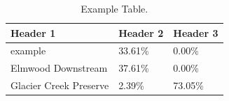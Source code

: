 \begin{table}[htbp]
    \centering
    \caption{Example Table.}
    \label{tab:Example}
    \begin{tabular}{lll}
        \toprule
        \textbf{Header 1} & \textbf{Header 2} & \textbf{Header 3} \\
        \midrule
        example & 33.61\% & 0.00\% \\
        Elmwood Downstream & 37.61\% & 0.00\% \\
        Glacier Creek Preserve & 2.39\% & 73.05\% \\
        \bottomrule
    \end{tabular}
\end{table}